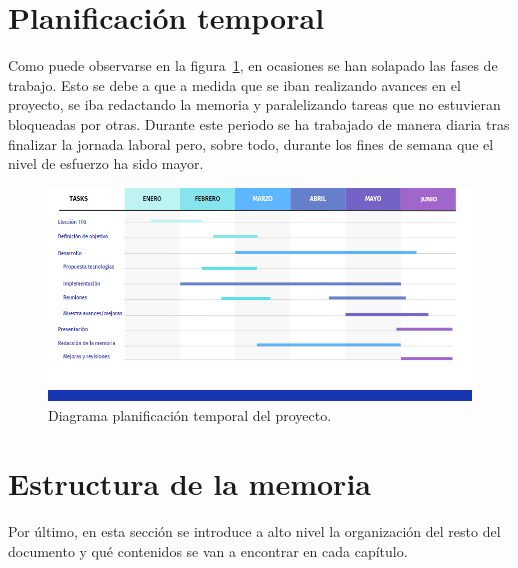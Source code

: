 \documentclass[a4paper, 12pt]{book}
\begin{document}
\section{Planificación temporal}
\label{sec:planificacion-temporal}

Como puede observarse en la figura~\ref{figura:GANTT_TFG}, en ocasiones se han solapado las fases de trabajo. Esto se debe a que a medida que se iban realizando avances en el proyecto, se iba redactando la memoria y paralelizando tareas que no estuvieran bloqueadas por otras.
Durante este periodo se ha trabajado de manera diaria tras finalizar la jornada laboral pero, sobre todo, durante los fines de semana que el nivel de esfuerzo ha sido mayor. 
    \begin{figure}
        \centering
        \includegraphics[width=\textwidth]{img/GANTT_TFG.png}
        \caption{Diagrama planificación temporal del proyecto.}
        \label{figura:GANTT_TFG}
    \end{figure}
    


\section{Estructura de la memoria}
\label{sec:estructura}

Por último, en esta sección se introduce a alto nivel la organización del resto del documento
y qué contenidos se van a encontrar en cada capítulo.
\end{document}

